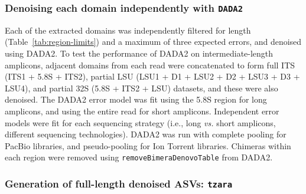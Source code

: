 \documentclass[
]{article}
\begin{document}
\hypertarget{denoising-each-domain-independently-with-dada2}{%
\subsubsection{\texorpdfstring{Denoising each domain independently with \texttt{DADA2}}{Denoising each domain independently with DADA2}}\label{denoising-each-domain-independently-with-dada2}}

Each of the extracted domains was independently filtered for length (Table~\ref{tab:region-limits}) and a maximum of three expected errors, and denoised using DADA2.
To test the performance of DADA2 on intermediate-length amplicons, adjacent domains from each read were concatenated to form full ITS (ITS1 + 5.8S + ITS2), partial LSU (LSU1 + D1 + LSU2 + D2 + LSU3 + D3 + LSU4), and partial 32S (5.8S + ITS2 + LSU) datasets, and these were also denoised.
The DADA2 error model was fit using the 5.8S region for long amplicons, and using the entire read for short amplicons.
Independent error models were fit for each sequencing strategy (i.e., long \emph{vs.} short amplicons, different sequencing technologies).
DADA2 was run with complete pooling for PacBio libraries, and pseudo-pooling
for Ion Torrent libraries.
Chimeras within each region were removed using \texttt{removeBimeraDenovoTable} from DADA2.

\hypertarget{generation-of-full-length-denoised-asvs-tzara}{%
\subsubsection{\texorpdfstring{Generation of full-length denoised ASVs: \texttt{tzara}}{Generation of full-length denoised ASVs: tzara}}\label{generation-of-full-length-denoised-asvs-tzara}}
\end{document}
